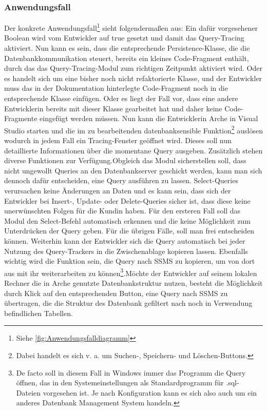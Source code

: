 \documentclass[11pt,toc=sectionentrywithoutdots, 
headheight=44pt, headings=optiontoheadandtoc, hyperfootnotes=false, hypertexnames=false]{scrartcl}
\newcommand\extendedref[1]{Siehe \ref{#1}}
\begin{document}
\subsubsection{Anwendungsfall}
Der konkrete Anwendungsfall\footnote{\extendedref{fig:Anwendungsfalldiagramm}} sieht folgendermaßen aus: Ein dafür vorgesehener \gls{Boolean} wird vom Entwickler auf \glqq true\grqq{} gesetzt und damit das Query-Tracing aktiviert. Nun kann es sein, dass die entsprechende Persistence-Klasse, die die Datenbankkommunikation steuert, bereits ein kleines Code-Fragment enthält, durch das das Query-Tracing-Modul zum richtigen Zeitpunkt aktiviert wird. Oder es handelt sich um eine bisher noch nicht refaktorierte Klasse, und der Entwickler muss das in der Dokumentation hinterlegte Code-Fragment noch in die entsprechende Klasse einfügen. Oder es liegt der Fall vor, dass eine andere Entwicklerin bereits mit dieser Klasse gearbeitet hat und daher keine Code-Fragmente eingefügt werden müssen. Nun kann die Entwicklerin Arche in Visual Studio starten und die im zu bearbeitenden datenbanksensible Funktion\footnote{Dabei handelt es sich v. a. um \glqq Suchen\grqq{}-, \glqq Speichern\grqq{}- und \glqq Löschen\grqq{}-Buttons.} auslösen wodurch in jedem Fall ein Tracing-Fenster geöffnet wird. Dieses soll nun detaillierte Informationen über die momentane Query ausgeben. Zusätzlich stehen diverse Funktionen zur Verfügung.\newline\newline Obgleich das Modul sicherstellen soll, dass nicht ungewollt Queries an den Datenbankserver geschickt werden, kann man sich dennoch dafür entscheiden, eine Query ausführen zu lassen. Select-Queries verursachen keine Änderungen an Daten und es kann sein, dass sich der Entwickler bei Insert-, Update- oder Delete-Queries sicher ist, dass diese keine unerwünschten Folgen für die Kundin haben. Für den ersteren Fall soll das Modul den Select-Befehl automatisch erkennen und die keine Möglichkeit zum Unterdrücken der Query geben. Für die übrigen Fälle, soll man frei entscheiden können. Weiterhin kann der Entwickler sich die Query automatisch bei jeder Nutzung des Query-Trackers in die Zwischenablage kopieren lassen. Ebenfalls wichtig wird die Funktion sein, die Query nach \acs{SSMS} zu kopieren, um von dort aus mit ihr weiterarbeiten zu können\footnote{De facto soll in diesem Fall in Windows immer das Programm die Query öffnen, das in den Systemeinstellungen als Standardprogramm für .sql-Dateien vorgesehen ist. Je nach Konfiguration kann es sich also auch um ein anderes \gls{Datenbank Management System} handeln.}.\newline Möchte der Entwickler auf seinem lokalen Rechner die in Arche genutzte Datenbankstruktur nutzen, besteht die Möglichkeit durch Klick auf den entsprechenden Button, eine Query nach SSMS zu übertragen, die die Struktur des Datenbank gefiltert nach noch in Verwendung befindlichen Tabellen.
\end{document}
